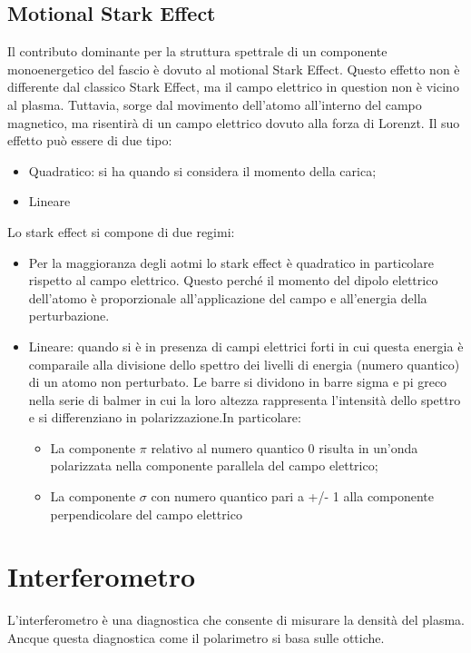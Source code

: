 \documentclass{article}
\begin{document}
\subsection{Motional Stark Effect}
Il contributo dominante per la struttura spettrale di un componente monoenergetico del fascio è dovuto al motional Stark Effect. Questo effetto non è differente dal classico Stark Effect, ma il campo elettrico in question non è vicino al plasma. Tuttavia, sorge dal movimento dell'atomo all'interno del campo magnetico, ma risentirà di un campo elettrico dovuto alla forza di Lorenzt.\newline
Il suo effetto può essere di due tipo:\begin{itemize}
	\item Quadratico: si ha quando si considera il momento della carica;
	\item Lineare
\end{itemize}
Lo stark effect si compone di due regimi:\begin{itemize}
	\item Per la maggioranza degli aotmi lo stark effect è quadratico in particolare rispetto al campo elettrico. Questo perché il momento del dipolo elettrico dell'atomo è proporzionale all'applicazione del campo e all'energia della perturbazione.
	\item Lineare: quando si è in presenza di campi elettrici forti in cui questa energia è comparaile alla divisione dello spettro dei livelli di energia (numero quantico) di un atomo non perturbato. Le barre si dividono in barre sigma e pi greco nella serie di balmer in cui la loro altezza rappresenta l'intensità dello spettro e si differenziano in polarizzazione.In particolare:\begin{itemize}
		      \item La componente \(\pi \) relativo al numero quantico 0 risulta in un'onda polarizzata nella componente parallela del campo elettrico;
		      \item La componente \(\sigma \) con numero quantico pari a +/- 1 alla componente perpendicolare del campo elettrico
	      \end{itemize}
\end{itemize}
\section{Interferometro}
L'interferometro è una diagnostica che consente di misurare la densità del plasma. Ancque questa diagnostica come il polarimetro si basa sulle ottiche.\newpage
\end{document}
